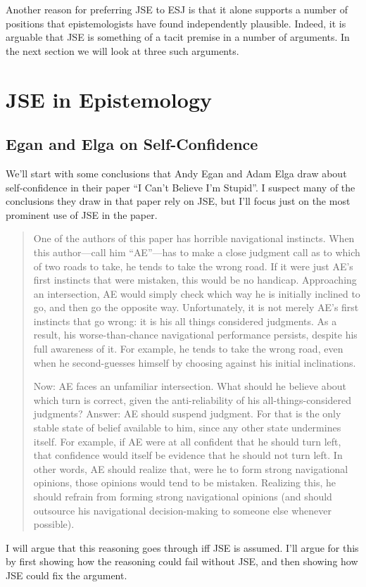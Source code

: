 Another reason for preferring JSE to ESJ is that it alone supports a number of positions that epistemologists have found independently plausible. Indeed, it is arguable that JSE is something of a tacit premise in a number of arguments. In the next section we will look at three such arguments.

\section{JSE in Epistemology}
\label{jseinepistemology}

\subsection{Egan and Elga on Self-Confidence}
\label{eganandelgaonself-confidence}

We'll start with some conclusions that Andy Egan and Adam Elga draw about self-confidence in their paper ``I Can't Believe I'm Stupid''. I suspect many of the conclusions they draw in that paper rely on JSE, but I'll focus just on the most prominent use of JSE in the paper.

\begin{quote}
One of the authors of this paper has horrible navigational instincts. When this author---call him ``\gls{AE}''---has to make a close judgment call as to which of two roads to take, he tends to take the wrong road. If it were just \gls{AE}'s first instincts that were mistaken, this would be no handicap. Approaching an intersection, \gls{AE} would simply check which way he is initially inclined to go, and then go the opposite way. Unfortunately, it is not merely \gls{AE}'s first instincts that go wrong: it is his all things considered judgments. As a result, his worse-than-chance navigational performance persists, despite his full awareness of it. For example, he tends to take the wrong road, even when he second-guesses himself by choosing against his initial inclinations.

Now: \gls{AE} faces an unfamiliar intersection. What should he believe about which turn is correct, given the anti-reliability of his all-things-considered judgments? Answer: \gls{AE} should suspend judgment. For that is the only stable state of belief available to him, since any other state undermines itself. For example, if \gls{AE} were at all confident that he should turn left, that confidence would itself be evidence that he should not turn left. In other words, \gls{AE} should realize that, were he to form strong navigational opinions, those opinions would tend to be mistaken. Realizing this, he should refrain from forming strong navigational opinions (and should outsource his navigational decision-making to someone else whenever possible). ~\citep[82-3]{EganElga2005}
\end{quote}
I will argue that this reasoning goes through iff JSE is assumed. I'll argue for this by first showing how the reasoning could fail without JSE, and then showing how JSE could fix the argument.

